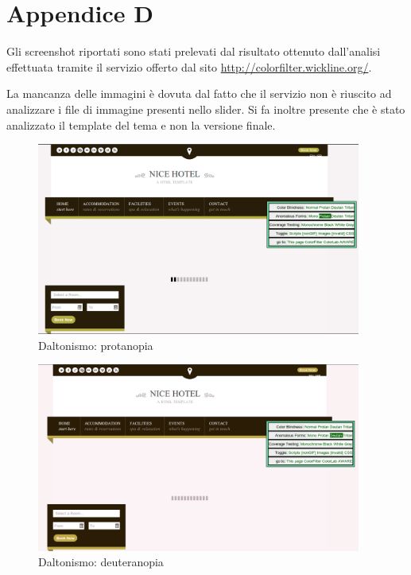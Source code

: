 \documentclass[a4paper,12pt,hidelinks]{report}
\begin{document}
\section{Appendice D}
Gli screenshot riportati sono stati prelevati dal risultato ottenuto dall'analisi effettuata tramite il servizio offerto dal sito \url{http://colorfilter.wickline.org/}. 
\par La mancanza delle immagini è dovuta dal fatto che il servizio non è riuscito ad analizzare i file di immagine presenti nello slider. Si fa inoltre presente che è stato 
analizzato il template del tema e non la versione finale.
\begin{figure}[h!]%
  \includegraphics[width=0.95\textwidth,keepaspectratio=true]{img/daltonismoProtanopia}
  \centering
  \caption{Daltonismo: protanopia}%
  \label{fig:daltonismoProtanopia}%
\end{figure}

\begin{figure}[h!]%
  \includegraphics[width=0.95\textwidth,keepaspectratio=true]{img/daltonismoDeuteranopia}
  \centering
  \caption{Daltonismo: deuteranopia}%
  \label{fig:daltonismoDeuteranopia}%
\end{figure}
\end{document}
